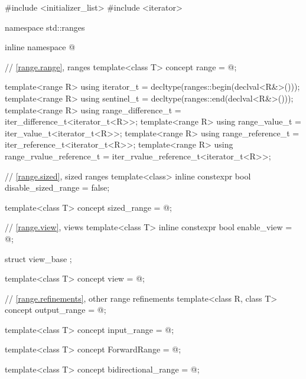 %
\begin{codeblock}
#include <initializer_list>
#include <iterator>

namespace std::ranges {
  inline namespace @

  // \ref{range.range}, ranges
  template<class T>
    concept range = @\seebelow@;

  template<range R>
    using iterator_t = decltype(ranges::begin(declval<R&>()));
  template<range R>
    using sentinel_t = decltype(ranges::end(declval<R&>()));
  template<range R>
    using range_difference_t = iter_difference_t<iterator_t<R>>;
  template<range R>
    using range_value_t = iter_value_t<iterator_t<R>>;
  template<range R>
    using range_reference_t = iter_reference_t<iterator_t<R>>;
  template<range R>
    using range_rvalue_reference_t = iter_rvalue_reference_t<iterator_t<R>>;

  // \ref{range.sized}, sized ranges
  template<class>
    inline constexpr bool disable_sized_range = false;

  template<class T>
    concept sized_range = @\seebelow@;

  // \ref{range.view}, views
  template<class T>
    inline constexpr bool enable_view = @\seebelow@;

  struct view_base { };

  template<class T>
    concept view = @\seebelow@;

  // \ref{range.refinements}, other range refinements
  template<class R, class T>
    concept output_range = @\seebelow@;

  template<class T>
    concept input_range = @\seebelow@;

  template<class T>
    concept ForwardRange = @\seebelow@;

  template<class T>
    concept bidirectional_range = @\seebelow@;

}
\end{codeblock}
